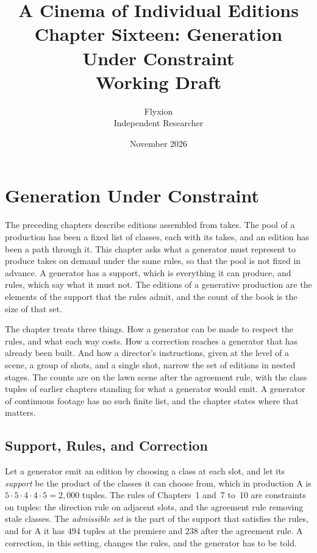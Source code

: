 \documentclass[11pt,twoside,openright]{book}
\title{\Huge\bfseries A Cinema of Individual Editions\\[1.2ex]
\large Chapter Sixteen: Generation Under Constraint\\[0.4ex]
\large Working Draft}
\author{Flyxion\\[0.3ex]\small Independent Researcher}
\date{November 2026}
\theoremstyle{plain}
\theoremstyle{definition}
\theoremstyle{remark}
\begin{document}
\frontmatter
\maketitle
\tableofcontents
\mainmatter
\setcounter{chapter}{15}

\chapter{Generation Under Constraint}
\label{ch:generation}

The preceding chapters describe editions assembled from takes. The pool of a production has been a fixed list of classes, each with its takes, and an edition has been a path through it. This chapter asks what a generator must represent to produce takes on demand under the same rules, so that the pool is not fixed in advance. A generator has a support, which is everything it can produce, and rules, which say what it must not. The editions of a generative production are the elements of the support that the rules admit, and the count of the book is the size of that set.

The chapter treats three things. How a generator can be made to respect the rules, and what each way costs. How a correction reaches a generator that has already been built. And how a director's instructions, given at the level of a scene, a group of shots, and a single shot, narrow the set of editions in nested stages. The counts are on the lawn scene after the agreement rule, with the class tuples of earlier chapters standing for what a generator would emit. A generator of continuous footage has no such finite list, and the chapter states where that matters.

\section{Support, Rules, and Correction}\label{sec:support16}

Let a generator emit an edition by choosing a class at each slot, and let its \emph{support} be the product of the classes it can choose from, which in production A is $5\cdot5\cdot4\cdot4\cdot5=2{,}000$ tuples. The rules of Chapters~1 and~7 to~10 are constraints on tuples: the direction rule on adjacent slots, and the agreement rule removing stale classes. The \emph{admissible set} is the part of the support that satisfies the rules, and for A it has $494$ tuples at the premiere and $238$ after the agreement rule. A correction, in this setting, changes the rules, and the generator has to be told.
\end{document}
